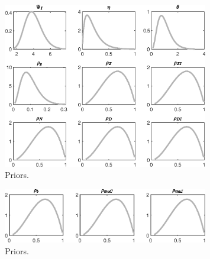\begin{figure}[H]
\centering
\includegraphics[width=0.80\textwidth]{BRS_sectoral_rest/graphs/BRS_sectoral_rest_Priors4}
\caption{Priors.}\label{Fig:Priors:4}
\end{figure}
\begin{figure}[H]
\centering
\includegraphics[width=0.80\textwidth]{BRS_sectoral_rest/graphs/BRS_sectoral_rest_Priors5}
\caption{Priors.}\label{Fig:Priors:5}
\end{figure}
 
